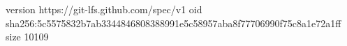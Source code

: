 version https://git-lfs.github.com/spec/v1
oid sha256:5c5575832b7ab3344846808388991e5c58957aba8f77706990f75c8a1e72a1ff
size 10109
